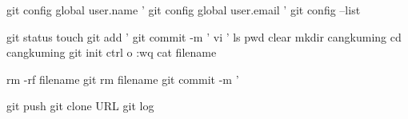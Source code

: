 git config global user.name '%
git config global user.email '%
git config --list %

git status
touch %
git add '%
git commit -m '%
vi '%
ls %
pwd %
clear
mkdir cangkuming  %
cd cangkuming %
git init %
ctrl o %
:wq   %
cat filename %

rm -rf filename
git rm filename
git commit -m '%

git push %
git clone URL
git log %
